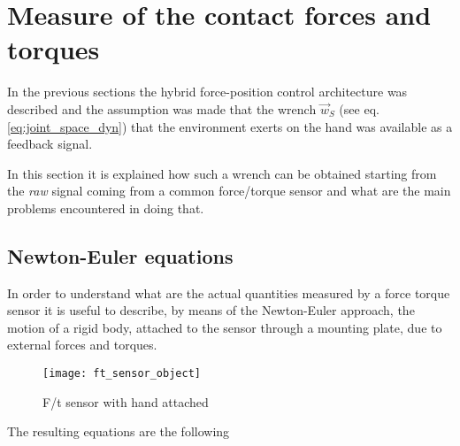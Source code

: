 \section{Measure of the contact forces and torques}
In the previous sections the hybrid force-position control architecture was described
and the assumption was made that the wrench $\vec{w}_{S}$ (see eq. \ref{eq:joint_space_dyn})
that the environment exerts on the hand was available as a feedback signal.
\par
In this section it is explained how such a wrench can be obtained starting from the \emph{raw} signal
coming from a common force/torque sensor and what are the main problems encountered in doing that.

\subsection{Newton-Euler equations}
In order to understand what are the actual quantities measured by a force torque sensor it is useful
to describe, by means of the Newton-Euler approach, the motion of a rigid body, attached to the
sensor through a mounting plate, due to external forces and torques.
\begin{figure}[h]
  \centering
  \texttt{[image: ft\_sensor\_object]}
  \caption{F/t sensor with hand attached \label{fig:ft_sensor_object}}
\end{figure}


The resulting equations are the following


